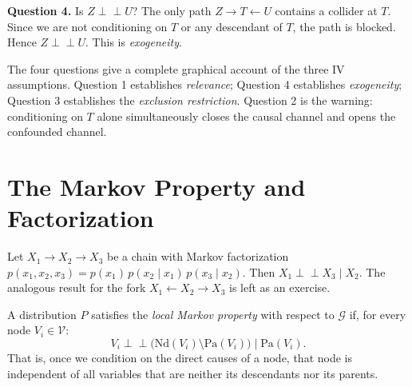 \documentclass[
  a4paper,
]{book}
\newcommand{\indep}{\perp\!\!\!\perp}
\newcommand{\Gcal}{\mathcal{G}}
\newcommand{\Pa}{\mathrm{Pa}}
\newcommand{\Nd}{\mathrm{Nd}}
\begin{document}
\textbf{Question 4.} Is \(Z \indep U\)? The only path
\(Z \to T \leftarrow U\) contains a collider at \(T\). Since we are not
conditioning on \(T\) or any descendant of \(T\), the path is blocked.
Hence \(Z \indep U\). This is \emph{exogeneity}.

The four questions give a complete graphical account of the three IV
assumptions. Question 1 establishes \emph{relevance}; Question 4
establishes \emph{exogeneity}; Question 3 establishes the
\emph{exclusion restriction}. Question 2 is the warning: conditioning on
\(T\) alone simultaneously closes the causal channel and opens the
confounded channel.

\section{The Markov Property and Factorization}\label{sec-markov}

\begin{tcolorbox}[enhanced jigsaw, arc=.35mm, bottomrule=.15mm, bottomtitle=1mm, breakable, colback=white, colbacktitle=quarto-callout-tip-color!10!white, colframe=quarto-callout-tip-color-frame, coltitle=black, left=2mm, leftrule=.75mm, opacityback=0, opacitybacktitle=0.6, rightrule=.15mm, title={Proposition: Conditional Independence in the Three-Node Chain}, titlerule=0mm, toprule=.15mm, toptitle=1mm]

Let \(X_1 \to X_2 \to X_3\) be a chain with Markov factorization
\(p(x_1, x_2, x_3) = p(x_1)\,p(x_2 \mid x_1)\,p(x_3 \mid x_2)\). Then
\(X_1 \indep X_3 \mid X_2\). The analogous result for the fork
\(X_1 \leftarrow X_2 \to X_3\) is left as an exercise.

\end{tcolorbox}

\begin{tcolorbox}[enhanced jigsaw, arc=.35mm, bottomrule=.15mm, bottomtitle=1mm, breakable, colback=white, colbacktitle=quarto-callout-note-color!10!white, colframe=quarto-callout-note-color-frame, coltitle=black, left=2mm, leftrule=.75mm, opacityback=0, opacitybacktitle=0.6, rightrule=.15mm, title={Definition: Local Markov Property}, titlerule=0mm, toprule=.15mm, toptitle=1mm]

A distribution \(P\) satisfies the \emph{local Markov property} with
respect to \(\Gcal\) if, for every node \(V_i \in \mathcal{V}\):
\[V_i \indep \bigl(\Nd(V_i) \setminus \Pa(V_i)\bigr) \mid \Pa(V_i).\]
That is, once we condition on the direct causes of a node, that node is
independent of all variables that are neither its descendants nor its
parents.

\end{tcolorbox}
\end{document}
